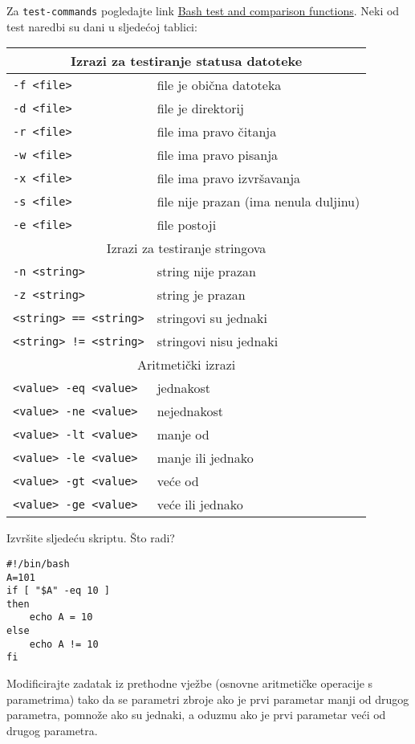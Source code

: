 Za \texttt{test-commands} pogledajte link \href{http://www.ibm.com/developerworks/library/l-bash-test/index.html}{Bash test and comparison functions}. Neki od test naredbi su dani u 
sljedećoj tablici:\\
\begin{longtable}{ll}
  \hline
  \multicolumn{2}{c}{Izrazi za testiranje statusa datoteke} \\
  \hline
  \texttt{-f <file>} & file je obična datoteka \\
  \texttt{-d <file>} & file je direktorij \\
  \texttt{-r <file>} & file ima pravo čitanja \\
  \texttt{-w <file>} & file ima pravo pisanja \\
  \texttt{-x <file>} & file ima pravo izvršavanja \\
  \texttt{-s <file>} & file nije prazan (ima nenula duljinu) \\
  \texttt{-e <file>} & file postoji \\
  \hline
  \multicolumn{2}{c}{Izrazi za testiranje stringova} \\
  \hline
  \texttt{-n <string>} & string nije prazan \\
  \texttt{-z <string>} & string je prazan \\
  \texttt{<string> == <string>} & stringovi su jednaki \\
\texttt{<string> != <string>} & stringovi nisu jednaki \\
\hline
  \multicolumn{2}{c}{Aritmetički izrazi} \\
  \hline
  \texttt{<value> -eq <value>} & jednakost \\
  \texttt{<value> -ne <value>} & nejednakost \\
  \texttt{<value> -lt <value>} & manje od \\
  \texttt{<value> -le <value>} & manje ili jednako \\
  \texttt{<value> -gt <value>} & veće od \\
  \texttt{<value> -ge <value>} & veće ili jednako \\
\hline
\end{longtable}
\begin{primjer} 
Izvršite sljedeću skriptu. Što radi?
\begin{lstlisting}
#!/bin/bash
A=101
if [ "$A" -eq 10 ]
then
    echo A = 10
else
    echo A != 10
fi
\end{lstlisting}
\end{primjer}
\begin{zadatak} Modificirajte zadatak iz prethodne vježbe (osnovne aritmetičke operacije s parametrima) tako da se parametri zbroje ako je prvi parametar manji od drugog parametra, 
pomnože ako su jednaki, a oduzmu ako je prvi parametar veći od drugog parametra.
\end{zadatak}
